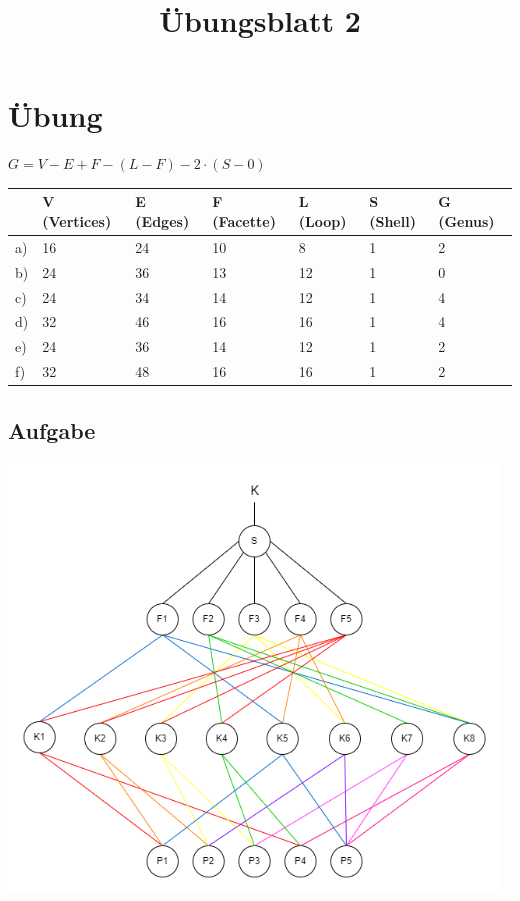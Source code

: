 \documentclass{article}
\title{Übungsblatt 2}
\begin{document}
\maketitle

\section{Übung}

$G = V - E + F - (L - F) - 2 \cdot (S - 0)$

\begin{table}[!ht]
    \centering
    \begin{tabular}{|l|l|l|l|l|l|l|}
    \hline
         \  & V (Vertices) & E (Edges) & F (Facette) & L (Loop) & S (Shell) & G (Genus)  \\ \hline
        a) & 16 & 24 & 10 & 8 & 1 & 2 \\ \hline
        b) & 24 & 36 & 13 & 12 & 1 & 0 \\ \hline
        c) & 24 & 34 & 14 & 12 & 1 & 4 \\ \hline
        d) & 32 & 46 & 16 & 16 & 1 & 4 \\ \hline
        e) & 24 & 36 & 14 & 12 & 1 & 2 \\ \hline
        f) & 32 & 48 & 16 & 16 & 1 & 2 \\ \hline
    \end{tabular}
\end{table}

\subsection{Aufgabe}
\includegraphics[width=370pt]{./files/Übung2.2.drawio.png}
\end{document}
